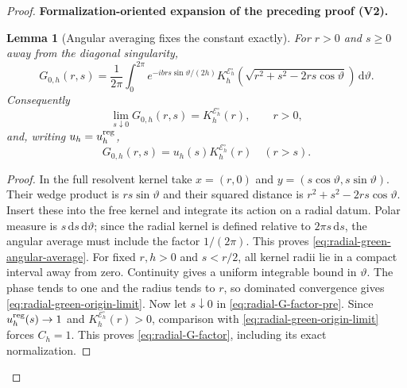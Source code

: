 \documentclass[11pt]{article}
\newtheorem{lemma}[theorem]{Lemma}
\newcommand{\formalisationparentid}{X}
\newenvironment{formalisationaddition}[1]{\par\medskip\begingroup\color{blue}\def\formalisationparentid{#1}\setcounter{formalizationsublemma}{0}\let\lemma\formalizationsublemma\let\endlemma\endformalizationsublemma
  \def\Eo{\mathcal E_h^\circ}\def\EE{\mathcal E_h}\def\phio{\phi_h^\circ}\def\phih{\phi_h}\def\Ho{H_h^{\rm atom}(v^\circ)}\def\Ha{H_h^{\rm atom}}\def\HL{H_h^{L}}\def\Dh{D_h}\def\Log{\operatorname{Log}}\def\ellh{\ell_h}\def\Gp{G_{p,h}}\def\Ast{A_{*,h}}\def\ahat{\widehat{\mathfrak a}_h}\def\ah{\mathfrak a_h}\def\rh{\widehat\rho_h}\def\deltah{\widehat\delta_h}\def\oldref##1{\textup{(##1)}}\def\interface##1{\par\noindent\textit{Analytical interface used here.} ##1\par}\def\finish{\par\noindent\textit{Conclusion of the formalization-oriented expansion.} }\par\noindent\textbf{Formalization-oriented expansion of the preceding proof (V2).}\par\smallskip
}{\par\endgroup\medskip
}
\begin{document}
\begin{proof}
\begin{formalisationaddition}{LB.2}
\begin{lemma}[Angular averaging fixes the constant exactly]\label{sublemma:LB-2-angular-average}
For $r>0$ and $s\ge0$ away from the diagonal singularity,
\begin{equation*}
 G_{0,h}(r,s)=\frac1{2\pi}\int_0^{2\pi}
 e^{-ibrs\sin\vartheta/(2h)}
 K_h^{\Eo}\left(\sqrt{r^2+s^2-2rs\cos\vartheta}\right)
 \,\mathrm d\vartheta.
\end{equation*}
Consequently
\begin{equation*}
 \lim_{s\downarrow0}G_{0,h}(r,s)=K_h^{\Eo}(r),\qquad r>0,
\end{equation*}
and, writing $u_h=u_h^{\rm reg}$,
\begin{equation*}
 G_{0,h}(r,s)=u_h(s)K_h^{\Eo}(r)\quad(r>s).
\end{equation*}
\end{lemma}
\begin{proof}
In the full resolvent kernel take $x=(r,0)$ and $y=(s\cos\vartheta,s\sin\vartheta)$. Their wedge product is $rs\sin\vartheta$ and their squared distance is $r^2+s^2-2rs\cos\vartheta$. Insert these into the free kernel and integrate its action on a radial datum. Polar measure is $s\,\mathrm ds\,\mathrm d\vartheta$; since the radial kernel is defined relative to $2\pi s\,\mathrm ds$, the angular average must include the factor $1/(2\pi)$. This proves \eqref{eq:radial-green-angular-average}. For fixed $r,h>0$ and $s<r/2$, all kernel radii lie in a compact interval away from zero. Continuity gives a uniform integrable bound in $\vartheta$. The phase tends to one and the radius tends to $r$, so dominated convergence gives \eqref{eq:radial-green-origin-limit}. Now let $s\downarrow0$ in \eqref{eq:radial-G-factor-pre}. Since $u_h^{\rm reg}(s)\to1$ and $K_h^{\Eo}(r)>0$, comparison with \eqref{eq:radial-green-origin-limit} forces $C_h=1$. This proves \eqref{eq:radial-G-factor}, including its exact normalization.
\end{proof}


\end{formalisationaddition}
\end{proof}
\end{document}
